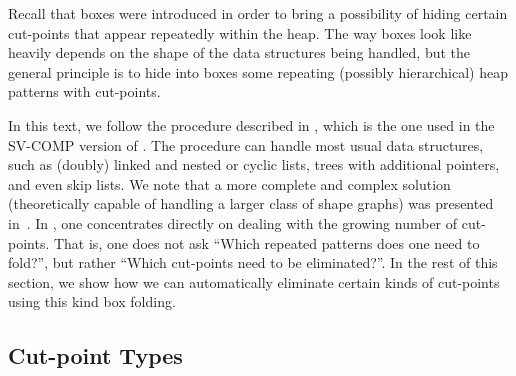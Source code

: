 Recall that boxes were introduced in order to bring a possibility of hiding certain
cut-points that appear repeatedly within the heap. The way boxes look like heavily depends on the shape of the data
structures being handled, but the general principle is to hide into boxes
some repeating (possibly hierarchical) heap patterns with cut-points. 

In this text, we follow the procedure described in \cite{jiri:diza}, 
which is the one used in the SV-COMP version of \forester.
The procedure can handle most usual data structures, such as (doubly) linked and
nested or cyclic lists, trees with additional pointers, and even skip lists.
%
We note that a more complete and complex solution (theoretically capable of
handling a larger class of shape graphs) was presented in~\cite{boxes13}.
%
%
%
%
In \cite{jiri:diza}, one concentrates directly on dealing with the growing
number of cut-points. That is, one does not ask ``Which repeated
patterns does one need to fold?'', but rather ``Which cut-points need to be eliminated?''.
In the rest of this section, we show how we can automatically eliminate certain
kinds of cut-points using this kind box folding.



\subsection{Cut-point Types}

